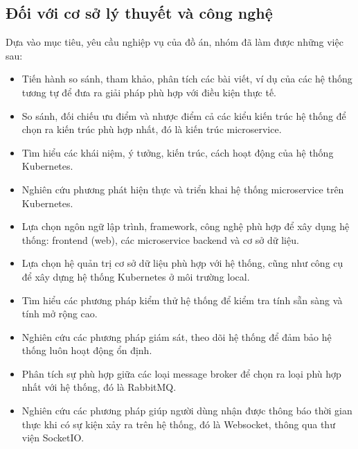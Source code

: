 \subsection{Đối với cơ sở lý thuyết và công nghệ}
\noindent Dựa vào mục tiêu, yêu cầu nghiệp vụ của đồ án, nhóm đã làm được những việc sau:
\begin{itemize}
    \item Tiến hành so sánh, tham khảo, phân tích các bài viết, ví dụ của các hệ thống tương tự để đưa ra giải pháp phù hợp với điều kiện thực tế.
    \item So sánh, đối chiếu ưu điểm và nhược điểm cả các kiểu kiến trúc hệ thống để chọn ra kiến trúc phù hợp nhất, đó là kiến trúc microservice.
    \item Tìm hiểu các khái niệm, ý tưởng, kiến trúc, cách hoạt động của hệ thống Kubernetes.
    \item Nghiên cứu phương phát hiện thực và triển khai hệ thống microservice trên Kubernetes.
    \item Lựa chọn ngôn ngữ lập trình, framework, công nghệ phù hợp để xây dụng hệ thống: frontend (web), các microservice backend và cơ sở dữ liệu.
    \item Lựa chọn hệ quản trị cơ sở dữ liệu phù hợp với hệ thống, cũng như công cụ để xây dựng hệ thống Kubernetes ở môi trường local.
    \item Tìm hiểu các phương pháp kiểm thử hệ thống để kiểm tra tính sẵn sàng và tính mở rộng cao.
    \item Nghiên cứu các phương pháp giám sát, theo dõi hệ thống để đảm bảo hệ thống luôn hoạt động ổn định.
    \item Phân tích sự phù hợp giữa các loại message broker để chọn ra loại phù hợp nhất với hệ thống, đó là RabbitMQ.
    \item Nghiên cứu các phương pháp giúp người dùng nhận được thông báo thời gian thực khi có sự kiện xảy ra trên hệ thống, đó là Websocket, thông qua thư viện SocketIO.
\end{itemize}
